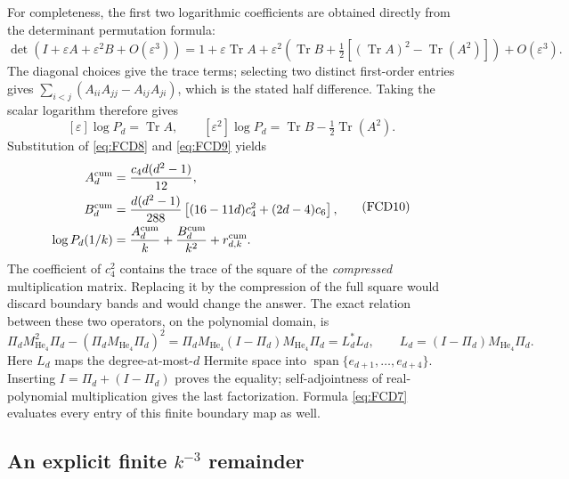 For completeness, the first two logarithmic coefficients are obtained
directly from the determinant permutation formula:
\[
 \det(I+\varepsilon A+\varepsilon^2B+O(\varepsilon^3))
 =1+\varepsilon\operatorname{Tr}A+
 \varepsilon^2\left(\operatorname{Tr}B+
    \tfrac12[(\operatorname{Tr}A)^2-\operatorname{Tr}(A^2)]\right)
 +O(\varepsilon^3).
\]
The diagonal choices give the trace terms; selecting two distinct
first-order entries gives
\(\sum_{i<j}(A_{ii}A_{jj}-A_{ij}A_{ji})\), which is the stated half
difference. Taking the scalar logarithm therefore gives
\[
 [\varepsilon]\log P_d=\operatorname{Tr}A,\qquad
 [\varepsilon^2]\log P_d=\operatorname{Tr}B-\tfrac12\operatorname{Tr}(A^2).
\]
Substitution of \eqref{eq:FCD8} and \eqref{eq:FCD9} yields
\begin{equation}
 \begin{split}
 A_d^{\rm cum}&=\frac{c_4d(d^2-1)}{12},\\
 B_d^{\rm cum}
   &=\frac{d(d^2-1)}{288}
                \left[(16-11d)c_4^2+(2d-4)c_6\right],\\
 \log P_d(1/k)&=\frac{A_d^{\rm cum}}k
                         +\frac{B_d^{\rm cum}}{k^2}
                         +r_{d,k}^{\rm cum}.
 \end{split}
 \tag{FCD10}\label{eq:FCD10}
\end{equation}
The coefficient of \(c_4^2\) contains the trace of the
square of the \emph{compressed} multiplication matrix. Replacing it
by the compression of the full square would discard boundary bands and
would change the answer.
The exact relation between these two operators, on the polynomial domain,
is
\[
 \Pi_d M_{\operatorname{He}_4}^2\Pi_d
       -(\Pi_dM_{\operatorname{He}_4}\Pi_d)^2
   =\Pi_dM_{\operatorname{He}_4}(I-\Pi_d)
                             M_{\operatorname{He}_4}\Pi_d
   =L_d^*L_d,\qquad
 L_d=(I-\Pi_d)M_{\operatorname{He}_4}\Pi_d .
\]
Here \(L_d\) maps the degree-at-most-\(d\) Hermite space into
\(\operatorname{span}\{e_{d+1},\ldots,e_{d+4}\}\).
Inserting \(I=\Pi_d+(I-\Pi_d)\) proves the equality;
self-adjointness of real-polynomial multiplication gives the last
factorization. Formula \eqref{eq:FCD7} evaluates every entry of
this finite boundary map as well.

\subsection{An explicit finite \(k^{-3}\) remainder}

